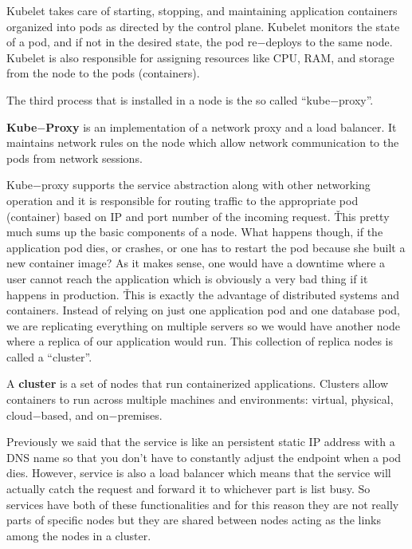 Kubelet takes care of starting, stopping, and maintaining application containers organized into pods as directed by
the control plane. Kubelet monitors the state of a pod, and if not in the desired state, the pod re$-$deploys to the
same node. Kubelet is also responsible for assigning resources like CPU, RAM, and storage from the node to the pods
(containers).


The third process that is installed in a node is the so called ``kube$-$proxy''.

\textbf{Kube$-$Proxy} is an implementation of a network proxy and a load balancer. It maintains network rules on the
node which allow network communication to the pods from network sessions.
\ed


Kube$-$proxy supports the service abstraction along with other networking operation and it is responsible for routing
traffic to the appropriate pod (container) based on IP and port number of the incoming request. \v

This pretty much sums up the basic components of a node. What happens though, if the application pod dies, or
crashes, or one has to restart the pod because she built a new container image? As it makes sense, one would have a
downtime where a user cannot reach the application which is obviously a very bad thing if it happens in production. \v

This is exactly the advantage of distributed systems and containers. Instead of relying on just one application pod
and one database pod, we are replicating everything on multiple servers so we would have another node where a replica
of our application would run. This collection of replica nodes is called a ``cluster''.

\bd[Cluster]
A \textbf{cluster} is a set of nodes that run containerized applications. Clusters allow containers to run across
multiple machines and environments: virtual, physical, cloud$-$based, and on$-$premises.
\ed

Previously we said that the service is like an persistent static IP address with a DNS name so that you don't have to
constantly adjust the endpoint when a pod dies. However, service is also a load balancer which means that the service
will actually catch the request and forward it to whichever part is list busy. So services have both of these
functionalities and for this reason they are not really parts of specific nodes but they are shared between nodes
acting as the links among the nodes in a cluster.

